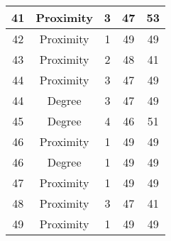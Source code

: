 \documentclass[results.tex]{subfiles}
\begin{document}
\begin{center}
\begin{tabular}{| c || c | c | c | c |}
            \hline
            41                      & Proximity                    & 3                      & 47                      & 53                   \\
            \hline
            42                      & Proximity                    & 1                      & 49                      & 49                   \\
            \hline
            43                      & Proximity                    & 2                      & 48                      & 41                   \\
            \hline
            44                      & Proximity                    & 3                      & 47                      & 49                   \\
            \hline
            44                      & Degree                       & 3                      & 47                      & 49                   \\
            \hline
            45                      & Degree                       & 4                      & 46                      & 51                   \\
            \hline
            46                      & Proximity                    & 1                      & 49                      & 49                   \\
            \hline
            46                      & Degree                       & 1                      & 49                      & 49                   \\
            \hline
            47                      & Proximity                    & 1                      & 49                      & 49                   \\
            \hline
            48                      & Proximity                    & 3                      & 47                      & 41                   \\
            \hline
            49                      & Proximity                    & 1                      & 49                      & 49                   \\
            \hline
        \end{tabular}
    \end{center}
\end{document}
